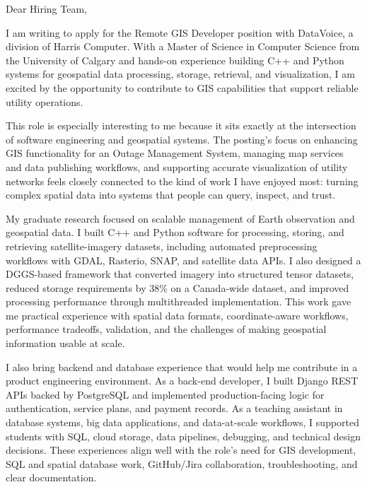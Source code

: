 \documentclass[11pt]{letter}
\begin{document}
\begin{letter}{}

\opening{Dear Hiring Team,}

I am writing to apply for the Remote GIS Developer position with DataVoice, a division of Harris Computer. With a Master of Science in Computer Science from the University of Calgary and hands-on experience building C++ and Python systems for geospatial data processing, storage, retrieval, and visualization, I am excited by the opportunity to contribute to GIS capabilities that support reliable utility operations.

This role is especially interesting to me because it sits exactly at the intersection of software engineering and geospatial systems. The posting's focus on enhancing GIS functionality for an Outage Management System, managing map services and data publishing workflows, and supporting accurate visualization of utility networks feels closely connected to the kind of work I have enjoyed most: turning complex spatial data into systems that people can query, inspect, and trust.

My graduate research focused on scalable management of Earth observation and geospatial data. I built C++ and Python software for processing, storing, and retrieving satellite-imagery datasets, including automated preprocessing workflows with GDAL, Rasterio, SNAP, and satellite data APIs. I also designed a DGGS-based framework that converted imagery into structured tensor datasets, reduced storage requirements by 38\% on a Canada-wide dataset, and improved processing performance through multithreaded implementation. This work gave me practical experience with spatial data formats, coordinate-aware workflows, performance tradeoffs, validation, and the challenges of making geospatial information usable at scale.

I also bring backend and database experience that would help me contribute in a product engineering environment. As a back-end developer, I built Django REST APIs backed by PostgreSQL and implemented production-facing logic for authentication, service plans, and payment records. As a teaching assistant in database systems, big data applications, and data-at-scale workflows, I supported students with SQL, cloud storage, data pipelines, debugging, and technical design decisions. These experiences align well with the role's need for GIS development, SQL and spatial database work, GitHub/Jira collaboration, troubleshooting, and clear documentation.


\end{letter}
\end{document}
